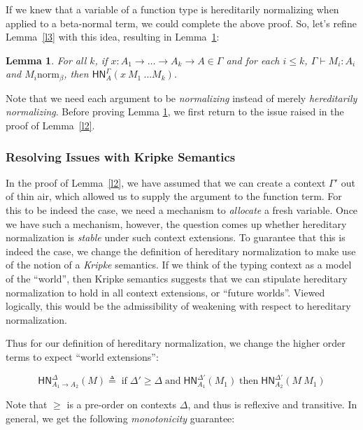 \documentclass{article}
\newtheorem{lem}[thm]{Lemma}
\newcommand{\hasEF}[3]{\ensuremath{#1 \vdash #2 : #3}}
\newcommand{\bnorm}[1]{\ensuremath{#1 \mathrel{\text{norm}_\beta}}}
\newcommand{\hnorm}[3]{\ensuremath{\mathsf{HN}^{#1}_{#2}(#3)}}
\newcommand{\fn}[2]{\ensuremath{#1 \to #2}}
\newcommand{\ap}[2]{\ensuremath{#1\ #2}}
\begin{document}
If we knew that a variable of a function type is hereditarily normalizing when applied to a
beta-normal term, we could complete the above proof.  So, let's refine Lemma~\ref{l3} with
this idea, resulting in Lemma~\ref{l4}:

\begin{lem}\label{l4}
For all $k$, if $x : A_1 \to \dots \to A_k \to A \in \Gamma$ and for each $i \le k$, $\hasEF{\Gamma}{M_i}{A_i}$ and $\bnorm{M_i}$, then $\hnorm{\Gamma}{A}{\ap{\ap{x}{M_1}}{\dots M_k}}$.
\end{lem}

Note that we need each argument to be \emph{normalizing} instead of merely \emph{hereditarily
  normalizing}.  Before proving Lemma \ref{l4}, we first return to the issue raised in the
proof of Lemma~\ref{l2}.

\subsubsection{Resolving Issues with Kripke Semantics}\label{sec:kripke_sem}

In the proof of Lemma~\ref{l2}, we have assumed that we can create a context $\Gamma'$ out of
thin air, which allowed us to supply the argument to the function term.  For this to be indeed
the case, we need a mechanism to \emph{allocate} a fresh variable.  Once we have such a
mechanism, however, the question comes up whether hereditary normalization is \emph{stable}
under such context extensions.  To guarantee that this is indeed the case, we change the
definition of hereditary normalization to make use of the notion of a \emph{Kripke} semantics.
If we think of the typing context as a model of the ``world'', then Kripke semantics suggests
that we can stipulate hereditary normalization to hold in all context extensions, or ``future
worlds''. Viewed logically, this would be the admissibility of weakening with respect to
hereditary normalization.

Thus for our definition of hereditary normalization, we change the higher order terms to expect
``world extensions'':

\[
\hnorm{\Delta}{\fn{A_1}{A_2}}{M} \triangleq \;\text{if}\; \Delta' \ge \Delta \;\text{and}\; \hnorm{\Delta'}{A_1}{M_1}
\;\text{then}\; \hnorm{\Delta'}{A_2}{\ap{M}{M_1}}
\]

Note that $\ge$ is a pre-order on contexts $\Delta$, and thus is reflexive and transitive.  In
general, we get the following \emph{monotonicity} guarantee:
\end{document}
